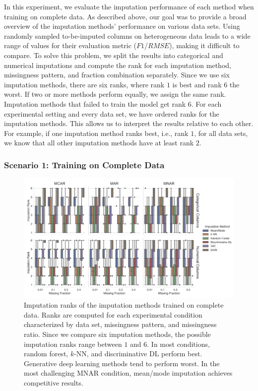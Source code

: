\documentclass[utf8]{frontiersSCNS} %
\begin{document}
In this experiment, we evaluate the imputation performance of each method when training on complete data. As described above, our goal was to provide a broad overview of the imputation methods' performance on various data sets. Using randomly sampled to-be-imputed columns on heterogeneous data leads to a wide range of values for their evaluation metric ($F1$/$RMSE$), making it difficult to compare. To solve this problem, we split the results into categorical and numerical imputations and compute the rank for each imputation method, missingness pattern, and fraction combination separately. Since we use six imputation methods, there are six ranks, where rank $1$ is best and rank $6$ the worst. If two or more methods perform equally, we assign the same rank. Imputation methods that failed to train the model get rank $6$. For each experimental setting and every data set, we have ordered ranks for the imputation methods. This allows us to interpret the results relative to each other. For example, if one imputation method ranks best, i.e., rank $1$, for all data sets, we know that all other imputation methods have at least rank $2$.



\subsubsection{Scenario 1: Training on Complete Data}
\label{sec:results_experiment1_scenario1}

\begin{figure}\centering
	\includegraphics[width=1\columnwidth]{fully_observed_impute_rank_boxplot}
	\caption{Imputation ranks of the  imputation methods trained on complete data. Ranks are computed for each experimental condition characterized by data set, missingness pattern, and missingness ratio. Since we compare six imputation methods, the possible imputation ranks range between $1$ and $6$. In most conditions, random forest, $k$-NN, and discriminative DL perform best. Generative deep learning methods tend to perform worst. In the most challenging MNAR condition, mean/mode imputation achieves competitive results.
	}
	\label{fig:fully_observed_impute_rank_boxplot}
\end{figure}
\end{document}
